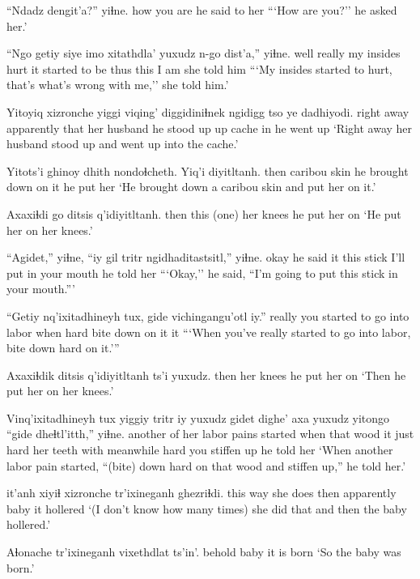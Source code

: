 \documentclass[12pt]{article}
\begin{document}
\gll ``Ndadz dengit'a?'' yiɬne.
how  {you are} {he said to her}
\glt ```How are you?'' he asked her.'
\glend

\gll ``Ngo  getiy  siye       imo  xitathdla'       yuxudz n-go dist'a,'' yiɬne.
well really {my insides} hurt {it started to be} thus  this {I am} {she told him}
\glt ```My insides started to hurt, that's what's wrong with me,'' she told him.'
\glend

\gll Yitoyiq    xizronche yiggi viqing'     diggidiniɬnek ngidigg tso   ye dadhiyodi.
{right away}  apparently      that  {her husband} {he stood up}  up   cache in {he went up}
\glt `Right away her husband stood up and went up into the cache.'
\glend

\gll Yitots'i ghinoy dhith nondoɬcheth.    Yiq'i diyitltanh.
then     caribou skin {he brought down} {on it} {he put her}
\glt `He brought down a caribou skin and put her on it.'
\glend

\gll Axaxiɬdi go  ditsis    q'idiyitltanh.
then      {this (one)} {her knees} {he put her on}
\glt `He put her on her knees.'
\glend

\gll ``Agidet,'' yiɬne, ``iy gil tritr  ngidhaditastsitl,''   yiɬne.
okay {he said} it this stick {I'll put in your mouth} {he told her}
\glt ```Okay,'' he said, ``I'm going to put this stick in your mouth.'''
\glend
 
\gll ``Getiy  nq'ixitadhineyh  tux,  gide vichingangu'otl    iy.''
really {you started to go into labor} when hard {bite down on it} it
\glt ```When you've really started to go into labor, bite down hard on it.'''
\glend

\gll Axaxiɬdik ditsis    q'idiyitltanh ts'i yuxudz.
then      {her knees}  {he put her on}
\glt `Then he put her on her knees.'
\glend
 
\gll Vinq'ixitadhineyh tux yiggiy tritr iy yuxudz gidet dighe'    axa  yuxudz yitongo ``gide dheɬtl'itth,'' yiɬne.
{another of her labor pains started}  when that    wood  it  just  hard  {her teeth} with  {}  meanwhile hard  {you stiffen up} {he told her}
\glt `When another labor pain started, ``(bite) down hard on that wood and stiffen up,'' he told her.'
\glend

     it'anh   xiyiɬ xizronche tr'ixineganh ghezriɬdi.
{this way} {she does} then  apparently      baby         {it hollered}
\glt `(I don't know how many times) she did that and then the baby hollered.'
\glend

\gll Aɬonache tr'ixineganh vixethdlat ts'in'.
behold   baby         {it is born}
\glt `So the baby was born.'
\glend
\end{document}
